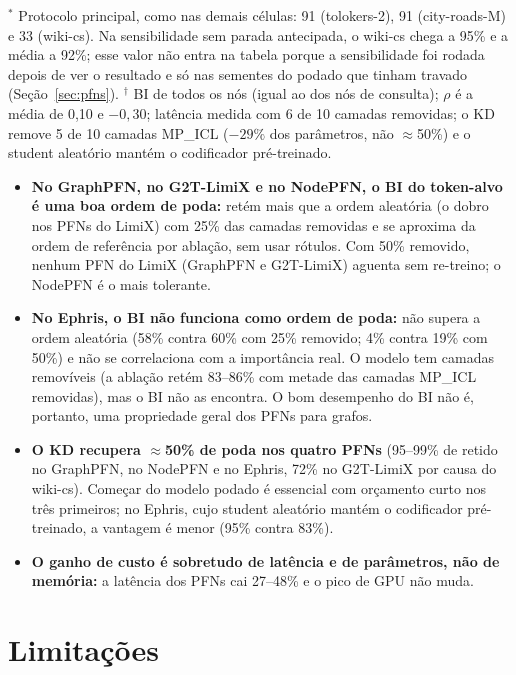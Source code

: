 \documentclass[12pt,a4paper]{article}
\begin{document}
\noindent $^*$ Protocolo principal, como nas demais células: 91 (tolokers-2), 91 (city-roads-M) e 33 (wiki-cs). Na sensibilidade sem parada antecipada, o wiki-cs chega a 95\% e a média a 92\%; esse valor não entra na tabela porque a sensibilidade foi rodada depois de ver o resultado e só nas sementes do podado que tinham travado (Seção~\ref{sec:pfns}). $^\dagger$ BI de todos os nós (igual ao dos nós de consulta); $\rho$ é a média de 0,10 e $-0{,}30$; latência medida com 6 de 10 camadas removidas; o KD remove 5 de 10 camadas MP\_ICL ($-29\%$ dos parâmetros, não $\approx$50\%) e o student aleatório mantém o codificador pré-treinado.

\begin{itemize}
  \item \textbf{No GraphPFN, no G2T-LimiX e no NodePFN, o BI do token-alvo é uma boa ordem de poda:} retém mais que a ordem aleatória (o dobro nos PFNs do LimiX) com 25\% das camadas removidas e se aproxima da ordem de referência por ablação, sem usar rótulos. Com 50\% removido, nenhum PFN do LimiX (GraphPFN e G2T-LimiX) aguenta sem re-treino; o NodePFN é o mais tolerante.
  \item \textbf{No Ephris, o BI não funciona como ordem de poda:} não supera a ordem aleatória (58\% contra 60\% com 25\% removido; 4\% contra 19\% com 50\%) e não se correlaciona com a importância real. O modelo tem camadas removíveis (a ablação retém 83--86\% com metade das camadas MP\_ICL removidas), mas o BI não as encontra. O bom desempenho do BI não é, portanto, uma propriedade geral dos PFNs para grafos.
  \item \textbf{O KD recupera $\approx$50\% de poda nos quatro PFNs} (95--99\% de retido no GraphPFN, no NodePFN e no Ephris, 72\% no G2T-LimiX por causa do wiki-cs). Começar do modelo podado é essencial com orçamento curto nos três primeiros; no Ephris, cujo student aleatório mantém o codificador pré-treinado, a vantagem é menor (95\% contra 83\%).
  \item \textbf{O ganho de custo é sobretudo de latência e de parâmetros, não de memória:} a latência dos PFNs cai 27--48\% e o pico de GPU não muda.
\end{itemize}


\section{Limitações}
\label{sec:limitacoes}
\end{document}
